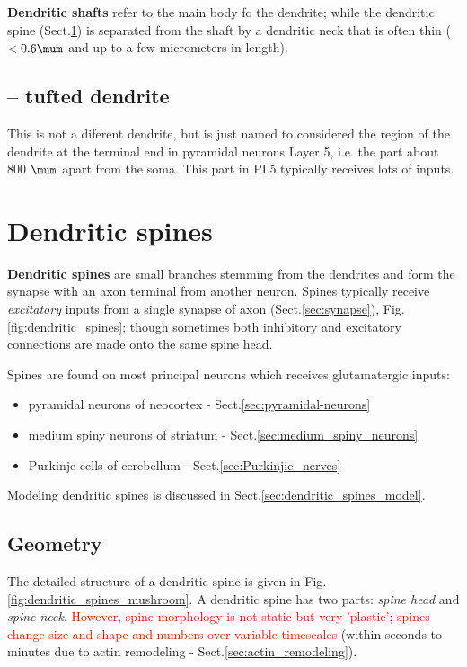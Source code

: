 {\bf Dendritic shafts} refer to the main body fo the dendrite;
while the dendritic spine (Sect.\ref{sec:dendritic_spines})
is separated from the shaft by a dendritic neck that is often thin ($< 0.6\mum$
and up to a few micrometers in length). 

\subsection{-- tufted dendrite}
\label{sec:tufted-dendrite}

This is not a diferent dendrite, but is just named to considered the region of
the dendrite at the terminal end in pyramidal neurons Layer 5, i.e. the part
about 800 $\mum$ apart from the soma. This part in PL5 typically receives lots
of inputs.

\section{Dendritic spines}
\label{sec:dendritic_spines}

{\bf Dendritic spines} are small branches stemming from the dendrites and form
the synapse with an axon terminal from another neuron. Spines typically receive
{\it excitatory} inputs from a single synapse of axon (Sect.\ref{sec:synapse}),
Fig.\ref{fig:dendritic_spines}; though sometimes both inhibitory and excitatory
connections are made onto the same spine head.

Spines are found on most principal neurons which receives glutamatergic inputs:
\begin{itemize}
  \item pyramidal neurons of neocortex - Sect.\ref{sec:pyramidal-neurons}
  \item medium spiny neurons of striatum - Sect.\ref{sec:medium_spiny_neurons}
  \item Purkinje cells of cerebellum - Sect.\ref{sec:Purkinjie_nerves}
\end{itemize}
Modeling dendritic spines is discussed in Sect.\ref{sec:dendritic_spines_model}.

\subsection{Geometry}
\label{sec:spine-geometry}

The detailed structure of a dendritic spine is given in
Fig.\ref{fig:dendritic_spines_mushroom}. A dendritic spine  has two parts:
{\it spine head} and {\it spine neck}.
\textcolor{red}{However, spine morphology is not static but very 'plastic';
spines change size and shape and numbers over variable timescales} \citep{hering2001}
(within seconds to minutes due to actin remodeling -
Sect.\ref{sec:actin_remodeling}).

